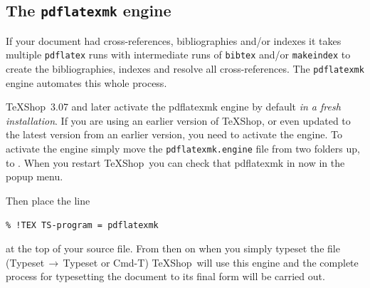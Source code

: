 \documentclass[letterpaper,11pt]{article}
\newcommand{\TS}{\textsf{\TeX Shop}}
\newcommand{\cmd}[1]{\textsf{#1}}
\newcommand{\mnu}[1]{\textsf{#1}}
\newcommand{\To}{\,\(\to\)\,}
\begin{document}
\subsection{The \texttt{pdflatexmk} engine}

If your document had cross-references, bibliographies and/or indexes it takes multiple \texttt{pdflatex} runs with intermediate runs of \texttt{bibtex} and/or \texttt{makeindex} to create the bibliographies, indexes and resolve all cross-references. The \texttt{pdflatexmk} engine automates this whole process.

\TS\ 3.07 and later activate the pdflatexmk engine by default \emph{in a fresh installation}. If you are using an earlier version of \TS, or even updated to the latest version from an earlier version, you need to activate the engine. To activate the engine simply move the \texttt{pdflatexmk.engine} file from  two folders up, to . When you restart \TS\ you can check that \cmd{pdflatexmk} in now in the popup menu.

\pagebreak
Then place the line
\begin{verbatim}
% !TEX TS-program = pdflatexmk
\end{verbatim}
at the top of your source file. From then on when you simply typeset the file (\mnu{Typeset}\To\mnu{Typeset} or \cmd{Cmd-T}) \TS\ will use this engine and the complete process for typesetting the document to its final form will be carried out.
\end{document}
